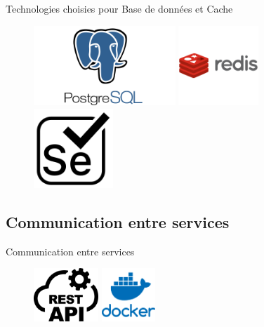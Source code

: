\begin{frame}{Technologies choisies pour Base de données et Cache}
    \begin{figure}[H]
        \centering
        \begin{minipage}{0.3\textwidth}
            \centering
            \includegraphics[height=3cm]{assets/images/postgres.png}
        \end{minipage}%
        \hspace{0.05\textwidth}
        \begin{minipage}{0.3\textwidth}
            \centering
            \includegraphics[height=3cm]{assets/images/redis.png}
        \end{minipage}%
        \hspace{0.05\textwidth}
        \begin{minipage}{0.3\textwidth}
            \centering
            \includegraphics[height=3cm]{assets/images/selenium.png}
        \end{minipage}
    \end{figure}
\end{frame}
\subsection{Communication entre services}
\begin{frame}{Communication entre services}
    \begin{figure}[H]
        \centering
        \includegraphics[height=2cm]{assets/images/rest.png}
        \hspace{0.1\textwidth}
        \includegraphics[height=2cm]{assets/images/docker.png}
    \end{figure}
\end{frame}

